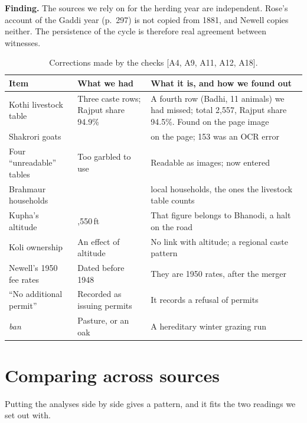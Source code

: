 \documentclass[10pt,a4paper,twocolumn]{article}
\newcommand{\entry}[1]{{\small\sffamily\color{muted}[#1]}}
\begin{document}
\begin{finding}
\textbf{Finding.} The sources we rely on for the herding year are independent. Rose's account of the Gaddi year (p.~297) is not copied from 1881, and Newell copies neither. The persistence of the cycle is therefore real agreement between witnesses.
\end{finding}

\begin{table}[!t]
\centering\small
\begin{tabularx}{\textwidth}{@{}>{\raggedright\arraybackslash}p{3.3cm}>{\raggedright\arraybackslash}X>{\raggedright\arraybackslash}X@{}}
\toprule
\textbf{Item} & \textbf{What we had} & \textbf{What it is, and how we found out}\\
\midrule
Kothi livestock table & Three caste rows; Rajput share 94.9\% & A fourth row (Badhi, 11 animals) we had missed; total 2,557, Rajput share 94.5\%. Found on the page image\\
Shakrori goats & 153 & 53 on the page; 153 was an OCR error\\
Four ``unreadable'' tables & Too garbled to use & Readable as images; now entered\\
Brahmaur households & 146 & 99 local households, the ones the livestock table counts\\
Kupha's altitude & 8,550\,ft & That figure belongs to Bhanodi, a halt on the road\\
Koli ownership & An effect of altitude & No link with altitude; a regional caste pattern\\
Newell's 1950 fee rates & Dated before 1948 & They are 1950 rates, after the merger\\
``No additional permit'' & Recorded as issuing permits & It records a refusal of permits\\
\emph{ban} & Pasture, or an oak & A hereditary winter grazing run\\
\bottomrule
\end{tabularx}
\caption{Corrections made by the checks \entry{A4, A9, A11, A12, A18}.}
\end{table}

\section{Comparing across sources}\label{sec:compare}

Putting the analyses side by side gives a pattern, and it fits the two readings we set out with.
\end{document}
